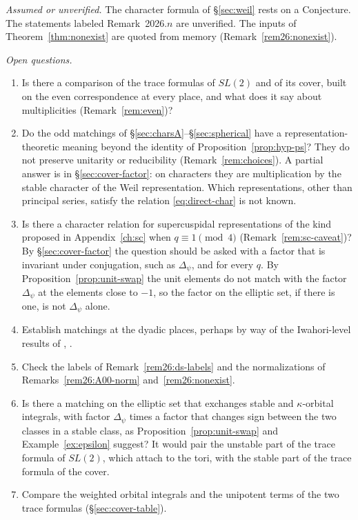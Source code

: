 \documentclass[12pt,letterpaper,openany]{book}
\theoremstyle{plain}
\theoremstyle{definition}
\theoremstyle{remark}
\theoremstyle{remark}
\begin{document}
\emph{Assumed or unverified.} The character formula of
\S\ref{sec:weil} rests on a Conjecture. The statements labeled
Remark~2026.$n$ are unverified. The inputs of
Theorem~\ref{thm:nonexist} are quoted from memory
(Remark~\ref{rem26:nonexist}).

\emph{Open questions.}
\begin{enumerate}
\item Is there a comparison of the trace formulas of $SL(2)$ and of its
cover, built on the even correspondence at every place, and what does it
say about multiplicities (Remark~\ref{rem:even})?
\item Do the odd matchings of \S\ref{sec:charsA}--\S\ref{sec:spherical}
have a representation-theoretic meaning beyond the identity of
Proposition~\ref{prop:hyp-ps}? They do not preserve unitarity or
reducibility (Remark~\ref{rem:choices}). A partial answer is in
\S\ref{sec:cover-factor}: on characters they are multiplication by the
stable character of the Weil representation. Which representations,
other than principal series, satisfy the relation
\eqref{eq:direct-char} is not known.
\item Is there a character relation for supercuspidal representations of
the kind proposed in Appendix~\ref{ch:sc} when $q\equiv1\pmod4$
(Remark~\ref{rem:sc-caveat})? By \S\ref{sec:cover-factor} the question
should be asked with a factor that is invariant under conjugation, such
as $\Delta_\psi$, and for every $q$. By
Proposition~\ref{prop:unit-swap} the unit elements do not match with the
factor $\Delta_\psi$ at the elements close to $-1$, so the factor on the
elliptic set, if there is one, is not $\Delta_\psi$ alone.
\item Establish matchings at the dyadic places, perhaps by way of the
Iwahori-level results of \cite{GS12}, \cite{TW}.
\item Check the labels of Remark~\ref{rem26:ds-labels} and the
normalizations of Remarks~\ref{rem26:A00-norm} and~\ref{rem26:nonexist}.
\item Is there a matching on the elliptic set that exchanges stable and
$\kappa$-orbital integrals, with factor $\Delta_\psi$ times a factor
that changes sign between the two classes in a stable class, as
Proposition~\ref{prop:unit-swap} and Example~\ref{ex:epsilon} suggest?
It would pair the unstable part of the trace formula of $SL(2)$, which
\cite{LL} attach to the tori, with the stable part of the trace formula
of the cover.
\item Compare the weighted orbital integrals and the unipotent terms of
the two trace formulas (\S\ref{sec:cover-table}).
\end{enumerate}
\end{document}
